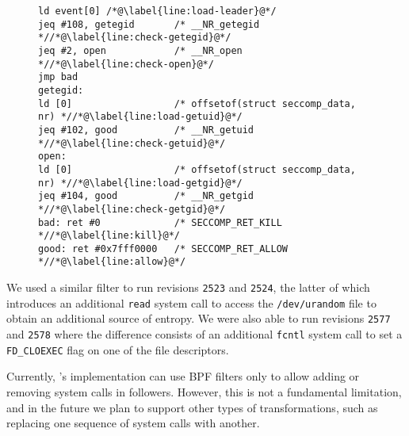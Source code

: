 
\begin{figure}[t]
\begin{center}
\begin{lstlisting}[label={lst:lighttpd},language={[bpf]Assembler},caption={Example of a BPF rewriting rule.}]
ld event[0] /*@\label{line:load-leader}@*/
jeq #108, getegid       /* __NR_getegid *//*@\label{line:check-getegid}@*/
jeq #2, open            /* __NR_open *//*@\label{line:check-open}@*/
jmp bad
getegid:
ld [0]                  /* offsetof(struct seccomp_data, nr) *//*@\label{line:load-getuid}@*/
jeq #102, good          /* __NR_getuid *//*@\label{line:check-getuid}@*/
open:
ld [0]                  /* offsetof(struct seccomp_data, nr) *//*@\label{line:load-getgid}@*/
jeq #104, good          /* __NR_getgid *//*@\label{line:check-getgid}@*/
bad: ret #0             /* SECCOMP_RET_KILL *//*@\label{line:kill}@*/
good: ret #0x7fff0000   /* SECCOMP_RET_ALLOW *//*@\label{line:allow}@*/
\end{lstlisting}
\end{center}
\end{figure}



We used a similar filter to run revisions \lstinline`2523` and
\lstinline`2524`, the latter of which introduces an additional
\lstinline`read` system call to access the \lstinline`/dev/urandom`
file to obtain an additional source of entropy.  We were also able to
run revisions \lstinline`2577` and \lstinline`2578` where the
difference consists of an additional \lstinline`fcntl` system call to
set a \lstinline`FD_CLOEXEC` flag on one of the file descriptors.

Currently, \varan's implementation can use BPF filters only to allow adding
or removing system calls in followers.  However, this is not a
fundamental limitation, and in the future we plan
to support  other types of transformations, such as replacing one
sequence of system calls with another.


